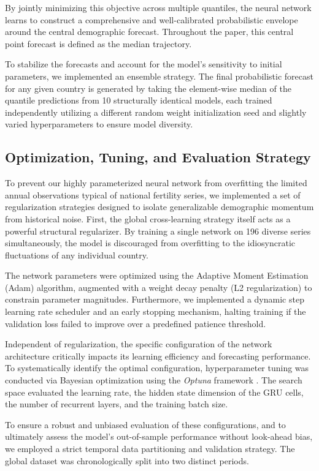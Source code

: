 \documentclass[12pt]{article}
\begin{document}
By jointly minimizing this objective across multiple quantiles, the neural network learns to construct a comprehensive and well-calibrated probabilistic envelope around the central demographic forecast. Throughout the paper, this central point forecast is defined as the median trajectory.

To stabilize the forecasts and account for the model's sensitivity to initial parameters, we implemented an ensemble strategy. The final probabilistic forecast for any given country is generated by taking the element-wise median of the quantile predictions from 10 structurally identical models, each trained independently utilizing a different random weight initialization seed and slightly varied hyperparameters to ensure model diversity.

\subsection{Optimization, Tuning, and Evaluation Strategy}

To prevent our highly parameterized neural network from overfitting the limited annual observations typical of national fertility series, we implemented a set of regularization strategies designed to isolate generalizable demographic momentum from historical noise. First, the global cross-learning strategy itself acts as a powerful structural regularizer. By training a single network on 196 diverse series simultaneously, the model is discouraged from overfitting to the idiosyncratic fluctuations of any individual country.

The network parameters were optimized using the Adaptive Moment Estimation (Adam) algorithm, augmented with a weight decay penalty (L2 regularization) to constrain parameter magnitudes. Furthermore, we implemented a dynamic step learning rate scheduler and an early stopping mechanism, halting training if the validation loss failed to improve over a predefined patience threshold.

Independent of regularization, the specific configuration of the network architecture critically impacts its learning efficiency and forecasting performance. To systematically identify the optimal configuration, hyperparameter tuning was conducted via Bayesian optimization using the \textit{Optuna} framework \citep{optuna_2019}. The search space evaluated the learning rate, the hidden state dimension of the GRU cells, the number of recurrent layers, and the training batch size.

To ensure a robust and unbiased evaluation of these configurations, and to ultimately assess the model's out-of-sample performance without look-ahead bias, we employed a strict temporal data partitioning and validation strategy. The global dataset was chronologically split into two distinct periods.
\end{document}
